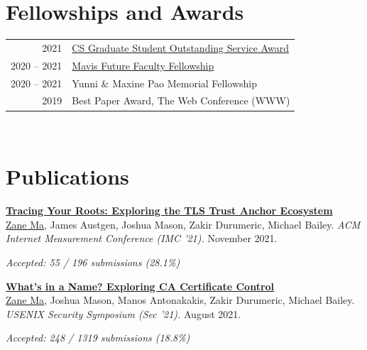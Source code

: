 \documentclass[10pt,singlecolumn]{article} %
\begin{document}
\section{Fellowships and Awards} 

\begin{tabular}{rl}

2021 & \href{https://cs.illinois.edu/about/awards/graduate-fellowships-awards/graduate-student-outstanding-service-award}{CS Graduate Student Outstanding Service Award} \\ 

2020 -- 2021 & \href{https://mavis.grainger.illinois.edu/}{Mavis Future Faculty Fellowship} \\

2020 -- 2021 & Yunni \& Maxine Pao Memorial Fellowship \\

2019 & Best Paper Award, The Web Conference (WWW) \\
\end{tabular}\\

\section{Publications} 


\textbf{\href{https://zanema.com/papers/imc21_roots.pdf}{Tracing Your Roots: Exploring the TLS Trust Anchor Ecosystem}}\\
\underline{Zane Ma}, James Austgen, Joshua Mason, Zakir Durumeric, Michael Bailey.
\textit{ACM Internet Measurement Conference (IMC '21).} November 2021.

{\raggedleft\textit{Accepted: 55 / 196 submissions (28.1\%)}\par}
\vspace{6pt}


\textbf{\href{https://zanema.com/papers/usenix21_ca_operators.pdf}{What's in a Name? Exploring CA Certificate Control}}\\
\underline{Zane Ma}, Joshua Mason, Manos Antonakakis, Zakir Durumeric, Michael Bailey.
\textit{USENIX Security Symposium (Sec '21).} August 2021.

{\raggedleft\textit{Accepted: 248 / 1319 submissions (18.8\%)}\par} 
\vspace{6pt}
\end{document}
